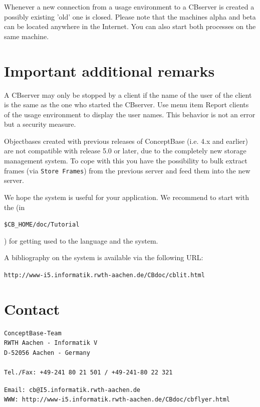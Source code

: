 Whenever a new connection from a usage environment to a CBserver is created a
possibly existing 'old' one is closed. Please note that the machines
alpha and beta can be located anywhere in the Internet. You can also start
both processes on the same machine.



\section{Important additional remarks}

A CBserver may only be stopped by a client if the name of the user of the
client is the same as the one who started the CBserver. Use menu item Report
clients of the usage environment to display the user names. This behavior is
not an error but a security measure.

Objectbases created with previous releases of ConceptBase (i.e. 4.x and earlier) are not compatible
with release 5.0 or later, due to the completely new storage management system.
To cope with this you have the possibility to bulk extract frames
(via \verb+Store Frames+) from the previous server and feed them into the new server.

We hope the system is useful for your application. We recommend to start with
the (in
\begin{latexonly}
\verb+$CB_HOME/doc/Tutorial+
\end{latexonly}
) for getting used to the language and the system.

A bibliography on the system is available via the following URL:\\
\begin{latexonly}
\verb+http://www-i5.informatik.rwth-aachen.de/CBdoc/cblit.html+
\end{latexonly}



\section{Contact}

\begin{verbatim}
ConceptBase-Team
RWTH Aachen - Informatik V
D-52056 Aachen - Germany

Tel./Fax: +49-241 80 21 501 / +49-241-80 22 321
\end{verbatim}
\begin{latexonly}
\verb+Email: cb@I5.informatik.rwth-aachen.de+ \\
\verb+WWW: http://www-i5.informatik.rwth-aachen.de/CBdoc/cbflyer.html+ \\
\end{latexonly}

